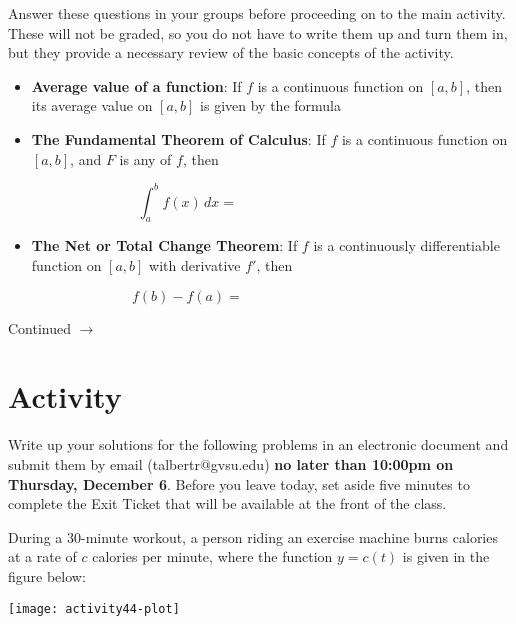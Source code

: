 \documentclass[11pt]{article}
\def\ra{\rightarrow}
\def\blank{\underline{\hspace{1in}}}
\def\pageturn{\vfill 
\begin{flushright}
	\begin{small}
		Continued $\ra$
	\end{small}
\end{flushright} \newpage}
\begin{document}
Answer these questions in your groups before proceeding on to the main activity. These will not be graded, so you do not have to write them up and turn them in, but they provide a necessary review of the basic concepts of the activity. 

\begin{itemize}
	\item \textbf{Average value of a function}: If $f$ is a continuous function on $[a,b]$, then its average value on $[a,b]$ is given by the formula
	
	\vspace{0.75in}
	
	\item \textbf{The Fundamental Theorem of Calculus}: If $f$ is a continuous function on $[a,b]$, and $F$ is any \blank of $f$, then 
	
	\[ \int_a^b f(x) \, dx = \hspace{2in} \]
	
	\item \textbf{The Net or Total Change Theorem}: If $f$ is a continuously differentiable function on $[a,b]$ with derivative $f'$, then 
	
	\[ f(b) - f(a) = \hspace{2in} \]
	
	
\end{itemize}

\pageturn



\section{Activity} %
\label{sec:activity}

Write up your solutions for the following problems in an electronic document and submit them by email (talbertr@gvsu.edu) \textbf{no later than 10:00pm on Thursday, December 6}. Before you leave today, set aside five minutes to complete the Exit Ticket that will be available at the front of the class. \\

\bigskip

During a 30-minute workout, a person riding an exercise machine burns calories at a rate of $c$ calories per minute, where the function $y = c(t)$ is given in the figure below: 

\begin{center}
	\texttt{[image: activity44-plot]}
\end{center}
\end{document}
